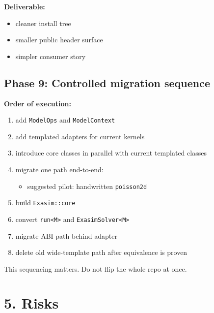 \documentclass[11pt]{article}
\begin{document}
\textbf{Deliverable:}
\begin{itemize}[leftmargin=*]
\item cleaner install tree
\item smaller public header surface
\item simpler consumer story
\end{itemize}

\subsection*{Phase 9: Controlled migration sequence}

\textbf{Order of execution:}
\begin{enumerate}[leftmargin=*]
\item add \texttt{ModelOps} and \texttt{ModelContext}
\item add templated adapters for current kernels
\item introduce core classes in parallel with current templated classes
\item migrate one path end-to-end:
\begin{itemize}[leftmargin=*]
\item suggested pilot: handwritten \texttt{poisson2d}
\end{itemize}
\item build \texttt{Exasim::core}
\item convert \texttt{run<M>} and \texttt{ExasimSolver<M>}
\item migrate ABI path behind adapter
\item delete old wide-template path after equivalence is proven
\end{enumerate}

This sequencing matters. Do not flip the whole repo at once.

\section*{5. Risks}
\end{document}

